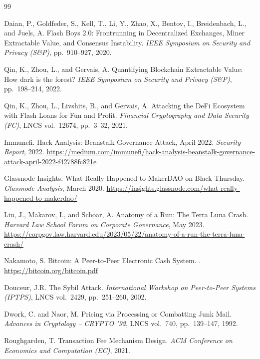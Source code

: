 \begin{thebibliography}{99}

Daian, P., Goldfeder, S., Kell, T., Li, Y., Zhao, X., Bentov, I., Breidenbach, L., and Juels, A.
\newblock Flash Boys 2.0: Frontrunning in Decentralized Exchanges, Miner Extractable Value, and Consensus Instability.
\newblock \emph{IEEE Symposium on Security and Privacy (S\&P)}, pp.~910--927, 2020.

Qin, K., Zhou, L., and Gervais, A.
\newblock Quantifying Blockchain Extractable Value: How dark is the forest?
\newblock \emph{IEEE Symposium on Security and Privacy (S\&P)}, pp.~198--214, 2022.

Qin, K., Zhou, L., Livshits, B., and Gervais, A.
\newblock Attacking the DeFi Ecosystem with Flash Loans for Fun and Profit.
\newblock \emph{Financial Cryptography and Data Security (FC)}, LNCS vol.~12674, pp.~3--32, 2021.

Immunefi.
\newblock Hack Analysis: Beanstalk Governance Attack, April 2022.
\newblock \emph{Security Report}, 2022.
\newblock \url{https://medium.com/immunefi/hack-analysis-beanstalk-governance-attack-april-2022-f42788fc821e}

Glassnode Insights.
\newblock What Really Happened to MakerDAO on Black Thursday.
\newblock \emph{Glassnode Analysis}, March 2020.
\newblock \url{https://insights.glassnode.com/what-really-happened-to-makerdao/}

Liu, J., Makarov, I., and Schoar, A.
\newblock Anatomy of a Run: The Terra Luna Crash.
\newblock \emph{Harvard Law School Forum on Corporate Governance}, May 2023.
\newblock \url{https://corpgov.law.harvard.edu/2023/05/22/anatomy-of-a-run-the-terra-luna-crash/}


Nakamoto, S.
\newblock Bitcoin: A Peer-to-Peer Electronic Cash System.
.
\newblock \url{https://bitcoin.org/bitcoin.pdf}

Douceur, J.R.
\newblock The Sybil Attack.
\newblock \emph{International Workshop on Peer-to-Peer Systems (IPTPS)}, LNCS vol.~2429, pp.~251--260, 2002.

Dwork, C. and Naor, M.
\newblock Pricing via Processing or Combatting Junk Mail.
\newblock \emph{Advances in Cryptology -- CRYPTO '92}, LNCS vol.~740, pp.~139--147, 1992.

Roughgarden, T.
\newblock Transaction Fee Mechanism Design.
\newblock \emph{ACM Conference on Economics and Computation (EC)}, 2021.


\end{thebibliography}
